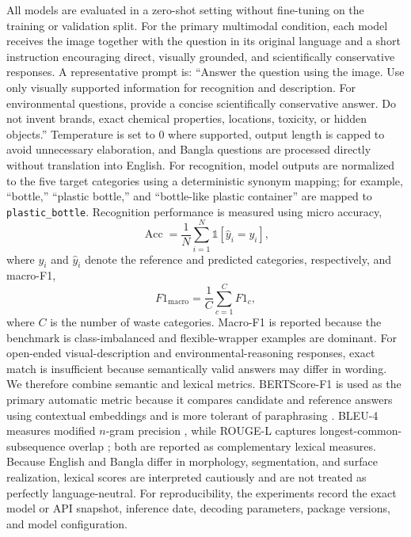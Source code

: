 \documentclass{article}
\begin{document}
All models are evaluated in a zero-shot setting without fine-tuning on the training or validation split. For the primary multimodal condition, each model receives the image together with the question in its original language and a short instruction encouraging direct, visually grounded, and scientifically conservative responses. A representative prompt is: ``Answer the question using the image. Use only visually supported information for recognition and description. For environmental questions, provide a concise scientifically conservative answer. Do not invent brands, exact chemical properties, locations, toxicity, or hidden objects.'' Temperature is set to 0 where supported, output length is capped to avoid unnecessary elaboration, and Bangla questions are processed directly without translation into English. For recognition, model outputs are normalized to the five target categories using a deterministic synonym mapping; for example, ``bottle,'' ``plastic bottle,'' and ``bottle-like plastic container'' are mapped to \texttt{plastic\_bottle}. Recognition performance is measured using micro accuracy,
\begin{equation}
\operatorname{Acc}
=
\frac{1}{N}
\sum_{i=1}^{N}
\mathbb{1}
\left[
\hat{y}_i = y_i
\right],
\label{eq:accuracy}
\end{equation}
where $y_i$ and $\hat{y}_i$ denote the reference and predicted categories, respectively, and macro-F1,
\begin{equation}
F1_{\mathrm{macro}}
=
\frac{1}{C}
\sum_{c=1}^{C}
F1_c,
\label{eq:macro_f1}
\end{equation}
where $C$ is the number of waste categories. Macro-F1 is reported because the benchmark is class-imbalanced and flexible-wrapper examples are dominant. For open-ended visual-description and environmental-reasoning responses, exact match is insufficient because semantically valid answers may differ in wording. We therefore combine semantic and lexical metrics. BERTScore-F1 is used as the primary automatic metric because it compares candidate and reference answers using contextual embeddings and is more tolerant of paraphrasing \citep{zhang2020bertscore}. BLEU-4 measures modified $n$-gram precision \citep{papineni2002bleu}, while ROUGE-L captures longest-common-subsequence overlap \citep{lin2004rouge}; both are reported as complementary lexical measures. Because English and Bangla differ in morphology, segmentation, and surface realization, lexical scores are interpreted cautiously and are not treated as perfectly language-neutral. For reproducibility, the experiments record the exact model or API snapshot, inference date, decoding parameters, package versions, and model configuration.
\end{document}
